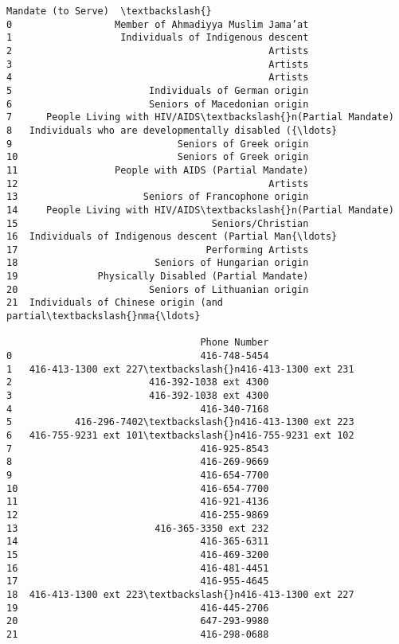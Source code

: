 \documentclass[11pt]{article}
\begin{document}
\begin{tcolorbox}[breakable, size=fbox, boxrule=.5pt, pad at break*=1mm, opacityfill=0]
\begin{Verbatim}[commandchars=\\\{\}]
                                   Mandate (to Serve)  \textbackslash{}
0                  Member of Ahmadiyya Muslim Jama’at
1                   Individuals of Indigenous descent
2                                             Artists
3                                             Artists
4                                             Artists
5                        Individuals of German origin
6                        Seniors of Macedonian origin
7      People Living with HIV/AIDS\textbackslash{}n(Partial Mandate)
8   Individuals who are developmentally disabled ({\ldots}
9                             Seniors of Greek origin
10                            Seniors of Greek origin
11                 People with AIDS (Partial Mandate)
12                                            Artists
13                      Seniors of Francophone origin
14     People Living with HIV/AIDS\textbackslash{}n(Partial Mandate)
15                                  Seniors/Christian
16  Individuals of Indigenous descent (Partial Man{\ldots}
17                                 Performing Artists
18                        Seniors of Hungarian origin
19              Physically Disabled (Partial Mandate)
20                       Seniors of Lithuanian origin
21  Individuals of Chinese origin (and partial\textbackslash{}nma{\ldots}

                                  Phone Number
0                                 416-748-5454
1   416-413-1300 ext 227\textbackslash{}n416-413-1300 ext 231
2                        416-392-1038 ext 4300
3                        416-392-1038 ext 4300
4                                 416-340-7168
5           416-296-7402\textbackslash{}n416-413-1300 ext 223
6   416-755-9231 ext 101\textbackslash{}n416-755-9231 ext 102
7                                 416-925-8543
8                                 416-269-9669
9                                 416-654-7700
10                                416-654-7700
11                                416-921-4136
12                                416-255-9869
13                        416-365-3350 ext 232
14                                416-365-6311
15                                416-469-3200
16                                416-481-4451
17                                416-955-4645
18  416-413-1300 ext 223\textbackslash{}n416-413-1300 ext 227
19                                416-445-2706
20                                647-293-9980
21                                416-298-0688
\end{Verbatim}
\end{tcolorbox}
        
\end{document}
